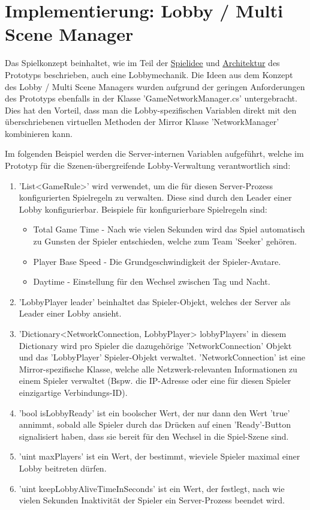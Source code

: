 \section{Implementierung: Lobby / Multi Scene Manager}
\label{Lobby Manager Implementierung}

Das Spielkonzept beinhaltet, wie im Teil der \hyperref[Spielidee]{Spielidee} und \hyperref[Architektur]{Architektur} des Prototyps beschrieben, auch eine Lobbymechanik. Die Ideen aus dem Konzept des Lobby / Multi Scene Managers wurden aufgrund der geringen Anforderungen des Prototyps ebenfalls in der Klasse 'GameNetworkManager.cs' untergebracht. Dies hat den Vorteil, dass man die Lobby-spezifischen Variablen direkt mit den überschriebenen virtuellen Methoden der Mirror Klasse 'NetworkManager' kombinieren kann.

Im folgenden Beispiel werden die Server-internen Variablen aufgeführt, welche im Prototyp für die Szenen-übergreifende Lobby-Verwaltung verantwortlich sind:
    
\begin{enumerate}
	\item 'List<GameRule>' wird verwendet, um die für diesen Server-Prozess konfigurierten Spielregeln zu verwalten. Diese sind durch den Leader einer Lobby konfigurierbar. Beispiele für konfigurierbare Spielregeln sind:
	\begin{itemize}
		\item Total Game Time - Nach wie vielen Sekunden wird das Spiel automatisch zu Gunsten der Spieler entschieden, welche zum Team 'Seeker' gehören.
		\item Player Base Speed - Die Grundgeschwindigkeit der Spieler-Avatare.
		\item Daytime - Einstellung für den Wechsel zwischen Tag und Nacht.
	\end{itemize}
	\item 'LobbyPlayer leader' beinhaltet das Spieler-Objekt, welches der Server als Leader einer Lobby ansieht.
	\item 'Dictionary<NetworkConnection, LobbyPlayer> lobbyPlayers' in diesem Dictionary wird pro Spieler die dazugehörige 'NetworkConnection' Objekt und das 'LobbyPlayer' Spieler-Objekt verwaltet. 'NetworkConnection' ist eine Mirror-spezifische Klasse, welche alle Netzwerk-relevanten Informationen zu einem Spieler verwaltet (Bspw. die IP-Adresse oder eine für diesen Spieler einzigartige Verbindungs-ID).
	\item 'bool isLobbyReady' ist ein boolscher Wert, der nur dann den Wert 'true' annimmt, sobald alle Spieler durch das Drücken auf einen 'Ready'-Button signalisiert haben, dass sie bereit für den Wechsel in die Spiel-Szene sind.
	\item 'uint maxPlayers' ist ein Wert, der bestimmt, wieviele Spieler maximal einer Lobby beitreten dürfen.
	\item 'uint keepLobbyAliveTimeInSeconds' ist ein Wert, der festlegt, nach wie vielen Sekunden Inaktivität der Spieler ein Server-Prozess beendet wird.
\end{enumerate}


